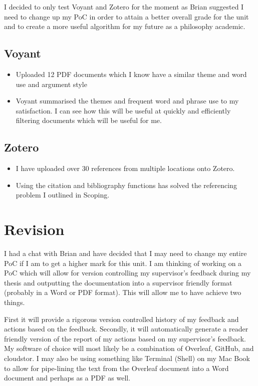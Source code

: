 \documentclass{article}
\begin{document}
I decided to only test Voyant and Zotero for the moment as Brian suggested I need to change up my PoC in order to attain a better overall grade for the unit and to create a more useful algorithm for my future as a philosophy academic.

\subsection{Voyant}

\begin{itemize}
    \item Uploaded 12 PDF documents which I know have a similar theme and word use and argument style
    \item Voyant summarised the themes and frequent word and phrase use to my satisfaction. I can see how this will be useful at quickly and efficiently filtering documents which will be useful for me.
    \end{itemize}
    
\subsection{Zotero}
\begin{itemize}
    \item I have uploaded over 30 references from multiple locations onto Zotero.
    \item Using the citation and bibliography functions has solved the referencing problem I outlined in Scoping.
\end{itemize}

\section{Revision}

I had a chat with Brian and have decided that I may need to change my entire PoC if I am to get a higher mark for this unit. I am thinking of working on a PoC which will allow for version controlling my supervisor's feedback during my thesis and outputting the documentation into a supervisor friendly format (probably in a Word or PDF format). This will allow me to have achieve two things. 

First it will provide a rigorous version controlled history of my feedback and actions based on the feedback. Secondly, it will automatically generate a reader friendly version of the report of my actions based on my supervisor's feedback. My software of choice will most likely be a combination of Overleaf, GitHub, and cloudstor. I may also be using something like Terminal (Shell) on my Mac Book to allow for pipe-lining the text from the Overleaf document into a Word document and perhaps as a PDF as well.
\end{document}
